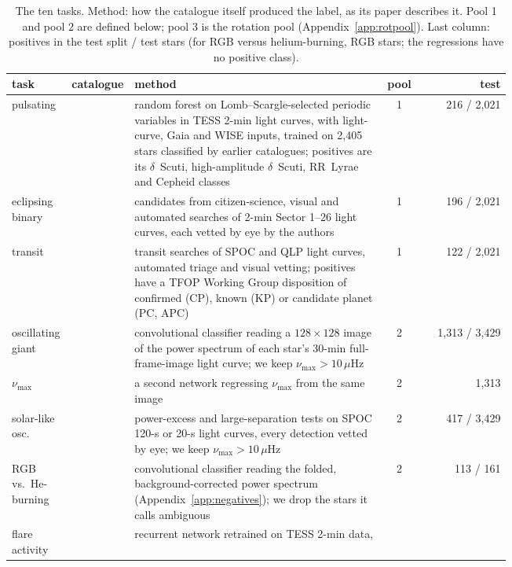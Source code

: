 \documentclass{article}
\begin{document}
\begin{table}[H]
\caption{The ten tasks. Method: how the catalogue itself produced the label, as its paper describes
it. Pool 1 and pool 2 are defined below; pool 3 is the rotation pool (Appendix~\ref{app:rotpool}).
Last column: positives in the test split / test stars (for RGB versus helium-burning, RGB stars; the
regressions have no positive class).}
\label{tab:tasks}
\centering
\scriptsize
\setlength{\tabcolsep}{4pt}
\begin{tabular}{>{\raggedright\arraybackslash}p{0.12\linewidth}>{\raggedright\arraybackslash}p{0.12\linewidth}>{\raggedright\arraybackslash}p{0.5\linewidth}cr}
\toprule
task & catalogue & method & pool & test \\
\midrule
pulsating & \citet{gao2025} & random forest on Lomb--Scargle-selected periodic variables in TESS
2-min light curves, with light-curve, Gaia and WISE inputs, trained on 2{,}405 stars classified by
earlier catalogues; positives are its $\delta$~Scuti, high-amplitude $\delta$~Scuti, RR~Lyrae and
Cepheid classes & 1 & 216 / 2{,}021 \\
eclipsing binary & \citet{prsa2022} & candidates from citizen-science, visual and automated searches
of 2-min Sector 1--26 light curves, each vetted by eye by the authors & 1 & 196 / 2{,}021 \\
transit & \citet{guerrero2021} & transit searches of SPOC and QLP light curves, automated triage and
visual vetting; positives have a TFOP Working Group disposition of confirmed (CP), known (KP) or
candidate planet (PC, APC) & 1 & 122 / 2{,}021 \\
oscillating giant & \citet{hon2021} & convolutional classifier reading a $128 \times 128$ image of
the power spectrum of each star's 30-min full-frame-image light curve; we keep
$\nu_{\max} > 10\,\mu$Hz & 2 & 1{,}313 / 3{,}429 \\
$\nu_{\max}$ & \citet{hon2021} & a second network regressing $\nu_{\max}$ from the same image & 2 &
1{,}313 \\
solar-like osc. & \citet{hatt2023} & power-excess and large-separation tests on SPOC 120-s or 20-s
light curves, every detection vetted by eye; we keep $\nu_{\max} > 10\,\mu$Hz & 2 & 417 / 3{,}429 \\
RGB vs.\ He-burning & \citet{sreenivas2026} & convolutional classifier reading the folded,
background-corrected power spectrum (Appendix~\ref{app:negatives}); we drop the stars it calls
ambiguous & 2 & 113 / 161 \\
flare activity & \citet{seli2025} & recurrent network \citep{vida2021} retrained on TESS 2-min data,

\end{tabular}
\end{table}
\end{document}
